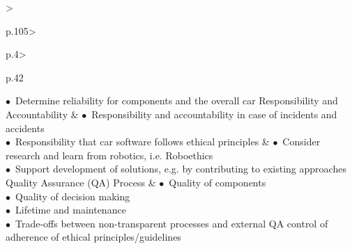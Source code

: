 \begin{table}[t]
\begin{small}
\begin{supertabular}{%
		>{\raggedright}p{.105\textwidth}>{\raggedright}p{.4\textwidth}>{\raggedright}p{.42\textwidth}}
				\noindent $\bullet$~Determine reliability for components and the overall car
 			 \tabularnewline \hline %
		\vspace{.1cm}	Responsibility and Accountability & \vspace{.1cm}
				\noindent $\bullet$~Responsibility and accountability in case of incidents and accidents\\
				\noindent $\bullet$~Responsibility that car software follows ethical principles \vspace{.2cm}%
			& \vspace{.1cm}
				\noindent $\bullet$~Consider research and learn from robotics, i.e. Roboethics \cite{Dodig-Crnkovic:2008:SMR:1566864.1566888}\\
				\noindent $\bullet$~Support development of solutions, e.g. by contributing to existing approaches  \cite{DepartmentforTransportDfT2017}
 			 \tabularnewline \hline %
			\vspace{.1cm}Quality Assurance (QA) Process & \vspace{.1cm}
				 \noindent $\bullet$~Quality of components\\
				 \noindent $\bullet$~Quality of decision making\\
				 \noindent $\bullet$~Lifetime and maintenance\\
				\noindent $\bullet$~Trade-offs between non-transparent processes and external QA control of adherence of ethical principles/guidelines \vspace{.2cm}%

\end{supertabular}
\end{small}
\end{table}
